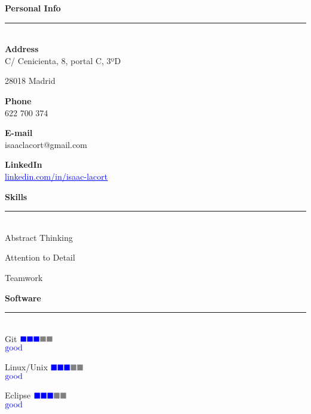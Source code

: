 \documentclass{article}
\begin{document}
\begin{minipage}{0.3\linewidth}
  
  \setlength{\parskip}{0.3em}
  \textbf{\Large{\color{BlueViolet}Personal Info}}\\[-0.25cm]
  {\color{BlueViolet} \rule{\linewidth}{0.1mm} } \\[-0.25cm]
  \textbf{\large{Address}}\\  
  C/ Cenicienta, 8, portal C, 3ºD
  
  28018 Madrid

  \textbf{\large{Phone}}\\
  622 700 374

  \textbf{\large{E-mail}}\\
  isaaclacort@gmail.com
  
  \textbf{\large{LinkedIn}}\\
  \href{https://www.linkedin.com/in/isaac-lacort-706725168/}{\textcolor{blue}{\underline{linkedin.com/in/isaac-lacort}}}
  
  \vspace{0.3cm}
  \textbf{\Large{\color{BlueViolet}Skills}}\\[-0.25cm]
  {\color{BlueViolet} \rule{\linewidth}{0.1mm} }\\[-0.25cm]
  Abstract Thinking 

  Attention to Detail

  Teamwork
  
  \vspace{0.3cm}
  \textbf{\Large{\color{BlueViolet}Software}}\\[-0.25cm]
  {\color{BlueViolet} \rule{\linewidth}{0.1mm} }\\
  \large Git \hfill $\color{blue} \blacksquare\color{blue} \blacksquare \color{blue} \blacksquare \color{gray} \blacksquare  \color{gray} \blacksquare$  \\[-0.8mm]
  \null\hfill \small{ $\color{blue} \textnormal{good}$}

  \large Linux/Unix \hfill $\color{blue} \blacksquare\color{blue} \blacksquare \color{blue} \blacksquare \color{gray} \blacksquare  \color{gray} \blacksquare$  \\[-0.8mm]
  \null\hfill \small{ $\color{blue} \textnormal{good}$}

  \large Eclipse \hfill $\color{blue} \blacksquare\color{blue} \blacksquare \color{blue} \blacksquare \color{gray} \blacksquare  \color{gray} \blacksquare$  \\[-0.8mm]
  \null\hfill \small{ $\color{blue} \textnormal{good}$}


\end{minipage}
\end{document}
